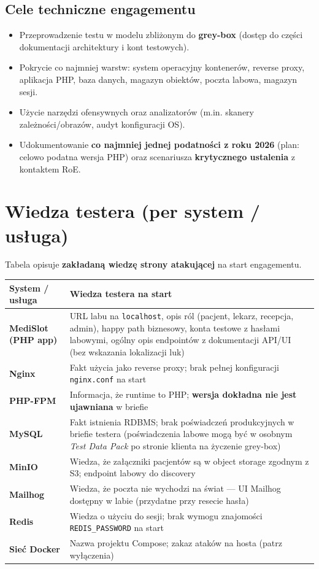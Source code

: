 \documentclass[11pt,a4paper]{article}
\begin{document}
\subsection{Cele techniczne engagementu}
\begin{itemize}[leftmargin=*]
  \item Przeprowadzenie testu w modelu zbliżonym do \textbf{grey-box} (dostęp do części dokumentacji architektury i kont testowych).
  \item Pokrycie co najmniej warstw: system operacyjny kontenerów, reverse proxy, aplikacja PHP, baza danych, magazyn obiektów, poczta labowa, magazyn sesji.
  \item Użycie narzędzi ofensywnych oraz analizatorów (m.in. skanery zależności/obrazów, audyt konfiguracji OS).
  \item Udokumentowanie \textbf{co najmniej jednej podatności z roku 2026} (plan: celowo podatna wersja PHP) oraz scenariusza \textbf{krytycznego ustalenia} z kontaktem RoE.
\end{itemize}

\section{Wiedza testera (per system / usługa)}

Tabela opisuje \textbf{zakładaną wiedzę strony atakującej} na start engagementu.

\begin{tabularx}{\textwidth}{@{}>{\bfseries}p{3cm} L@{}}
\toprule
\normalfont\textbf{System / usługa} & \textbf{Wiedza testera na start} \\
\midrule
MediSlot (PHP app) & URL labu na \texttt{localhost}, opis ról (pacjent, lekarz, recepcja, admin), happy path biznesowy, konta testowe z hasłami labowymi, ogólny opis endpointów z dokumentacji API/UI (bez wskazania lokalizacji luk) \\
Nginx & Fakt użycia jako reverse proxy; brak pełnej konfiguracji \texttt{nginx.conf} na start \\
PHP-FPM & Informacja, że runtime to PHP; \textbf{wersja dokładna nie jest ujawniana} w briefie \\
MySQL & Fakt istnienia RDBMS; brak poświadczeń produkcyjnych w briefie testera (poświadczenia labowe mogą być w osobnym \emph{Test Data Pack} po stronie klienta na życzenie grey-box) \\
MinIO & Wiedza, że załączniki pacjentów są w object storage zgodnym z S3; endpoint labowy do discovery \\
Mailhog & Wiedza, że poczta nie wychodzi na świat — UI Mailhog dostępny w labie (przydatne przy resecie hasła) \\
Redis & Wiedza o użyciu do sesji; brak wymogu znajomości \texttt{REDIS\_PASSWORD} na start \\
Sieć Docker & Nazwa projektu Compose; zakaz ataków na hosta (patrz wyłączenia) \\
\bottomrule
\end{tabularx}
\end{document}
